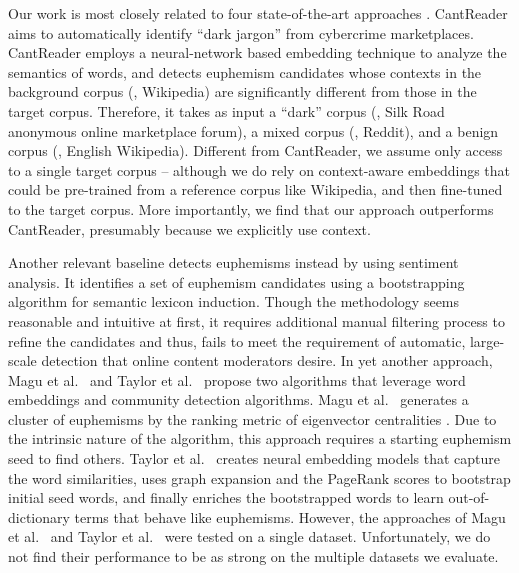 Our work is most closely related to four state-of-the-art approaches \cite{yuan2018reading,felt2020recognizing,taylor2017surfacing,magu2018determining}. 
CantReader \cite{yuan2018reading} aims to automatically identify ``dark jargon'' from cybercrime marketplaces. 
CantReader employs a neural-network based embedding technique to analyze the semantics of words, and detects euphemism candidates whose contexts in the background corpus (\eg, Wikipedia) are significantly different from those in the target corpus. 
Therefore, it takes as input a ``dark'' corpus (\eg, Silk Road anonymous online marketplace \cite{christin2013traveling} forum), a mixed corpus (\eg, Reddit), and a benign corpus (\eg, English Wikipedia). 
Different from CantReader, 
we assume only access to a single target corpus -- although we do rely on context-aware embeddings that could be pre-trained from a reference corpus like Wikipedia, and then fine-tuned to the target corpus.
More importantly, we find that our approach outperforms CantReader, presumably because we explicitly use context.

Another relevant baseline \cite{felt2020recognizing} detects euphemisms instead by using sentiment analysis. 
It identifies a set of  euphemism candidates using a bootstrapping algorithm for semantic lexicon induction. 
Though the methodology seems reasonable and intuitive at first, it requires additional manual filtering process to refine the candidates and thus, fails to meet the requirement of automatic, large-scale detection 
that online content moderators desire. 
In yet another approach, Magu et al.\ \cite{magu2018determining} and Taylor et al.\ \cite{taylor2017surfacing} propose two algorithms that leverage word embeddings and community detection algorithms. 
Magu et al.\ \cite{magu2018determining} generates a cluster of euphemisms by the ranking metric of eigenvector centralities \cite{bonacich1972factoring,bonacich1972technique}.
Due to the intrinsic nature of the algorithm, this approach 
requires a starting euphemism seed to find others. 
Taylor et al.\ \cite{taylor2017surfacing} creates neural embedding models that capture the word similarities, uses graph expansion and the PageRank scores \cite{page1999pagerank} to bootstrap initial seed words, and finally enriches the bootstrapped words to learn out-of-dictionary terms that behave like euphemisms.
However, the approaches of Magu et al.\ \cite{magu2018determining} and Taylor et al.\ \cite{taylor2017surfacing} were tested on a single dataset.  
Unfortunately, 
we do not find their performance to be as strong on the multiple datasets we evaluate. 

